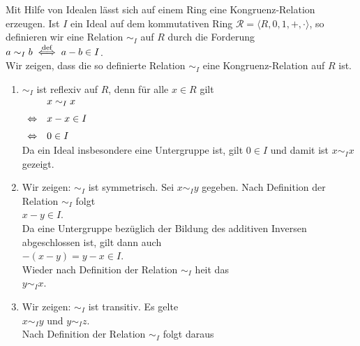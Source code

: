Mit Hilfe von Idealen l\"{a}sst sich auf einem Ring eine Kongruenz-Relation erzeugen.  Ist $I$ ein Ideal auf
dem kommutativen Ring $\mathcal{R} = \langle R, 0, 1, +, \cdot \rangle$, so definieren wir eine Relation $\sim_I$ auf
$R$ durch die Forderung
\\[0.2cm]
\hspace*{1.3cm}
$a \sim_I b \;\stackrel{\mbox{\scriptsize def}}{\Longleftrightarrow}\; a - b \in I$.
\\[0.2cm]
Wir zeigen, dass die so definierte Relation $\sim_I$ eine Kongruenz-Relation auf $R$ ist.
\begin{enumerate}
\item $\sim_I$ ist reflexiv auf $R$, denn f\"{u}r alle $x \in R$ gilt
      \\[0.2cm]
      \hspace*{1.3cm}
      $
      \begin{array}[t]{cl}
                      & x \sim_I x   \\[0.2cm] 
      \Leftrightarrow & x - x \in I  \\[0.2cm] 
      \Leftrightarrow & 0 \in I  
      \end{array}
      $
      \\[0.2cm]
      Da ein Ideal insbesondere eine Untergruppe ist, gilt $0 \in I$ und damit ist $x \sim_I x$
      gezeigt. {\color{green}{\checkmark}}
\item Wir zeigen: $\sim_I$ ist symmetrisch.  Sei $x \sim_I y$ gegeben.  Nach Definition der
      Relation $\sim_I$ folgt  
      \\[0.2cm]
      \hspace*{1.3cm}
      $x - y \in I$.
      \\[0.2cm]
      Da eine Untergruppe bez\"{u}glich der Bildung des additiven Inversen abgeschlossen ist, gilt dann auch
      \\[0.2cm]
      \hspace*{1.3cm}
      $-(x - y) = y - x \in I$.
      \\[0.2cm]
      Wieder nach Definition der Relation $\sim_I$ hei\3t das 
      \\[0.2cm]
      \hspace*{1.3cm}
      $y \sim_I x$.  
      {\color{green}{\checkmark}}
\item Wir zeigen: $\sim_I$ ist transitiv.  Es gelte
      \\[0.2cm]
      \hspace*{1.3cm}
      $x \sim_I y$ \quad und \quad $y \sim_I z$.
      \\[0.2cm]
      Nach Definition der Relation $\sim_I$ folgt daraus

\end{enumerate}
